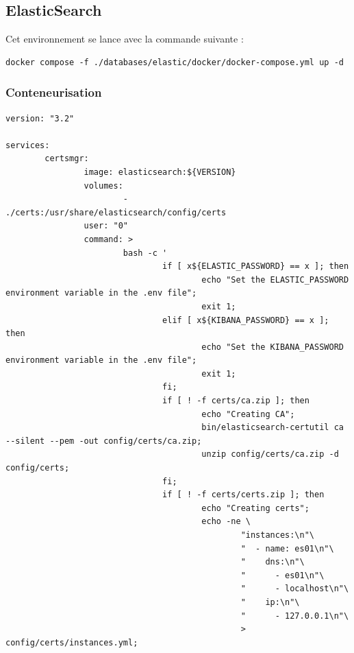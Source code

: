 \documentclass[a4paper,12pt]{article}
\begin{document}
	\subsection{ElasticSearch} \label{ES}
		Cet environnement se lance avec la commande suivante :
		\begin{verbatim}
docker compose -f ./databases/elastic/docker/docker-compose.yml up -d		
		\end{verbatim}
		
		\subsubsection{Conteneurisation}
			\begin{lstlisting}[title=DockerCompose]
version: "3.2"

services:
        certsmgr:
                image: elasticsearch:${VERSION}
                volumes:
                        - ./certs:/usr/share/elasticsearch/config/certs
                user: "0"
                command: >
                        bash -c '
                                if [ x${ELASTIC_PASSWORD} == x ]; then
                                        echo "Set the ELASTIC_PASSWORD environment variable in the .env file";
                                        exit 1;
                                elif [ x${KIBANA_PASSWORD} == x ]; then
                                        echo "Set the KIBANA_PASSWORD environment variable in the .env file";
                                        exit 1;
                                fi;
                                if [ ! -f certs/ca.zip ]; then
                                        echo "Creating CA";
                                        bin/elasticsearch-certutil ca --silent --pem -out config/certs/ca.zip;
                                        unzip config/certs/ca.zip -d config/certs;
                                fi;
                                if [ ! -f certs/certs.zip ]; then
                                        echo "Creating certs";
                                        echo -ne \
                                                "instances:\n"\
                                                "  - name: es01\n"\
                                                "    dns:\n"\
                                                "      - es01\n"\
                                                "      - localhost\n"\
                                                "    ip:\n"\
                                                "      - 127.0.0.1\n"\
                                                > config/certs/instances.yml;

\end{lstlisting}
\end{document}
